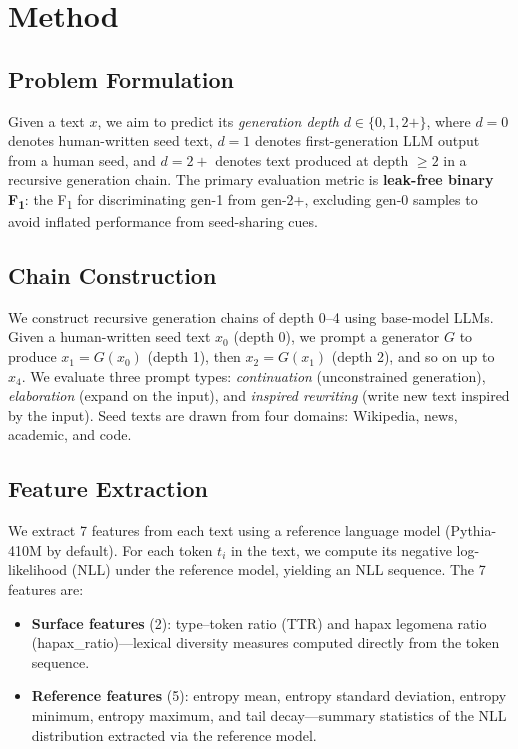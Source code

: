 \documentclass[11pt,a4paper]{article}
\newcommand{\fone}{F\textsubscript{1}}
\begin{document}
\section{Method}
\label{sec:method}

\subsection{Problem Formulation}
Given a text $x$, we aim to predict its \emph{generation depth} $d \in \{0, 1, 2+\}$,
where $d=0$ denotes human-written seed text, $d=1$ denotes first-generation LLM output from a human seed,
and $d=2+$ denotes text produced at depth $\geq 2$ in a recursive generation chain.
The primary evaluation metric is \textbf{leak-free binary \fone{}}: the \fone{} for discriminating gen-1 from gen-2+,
excluding gen-0 samples to avoid inflated performance from seed-sharing cues.

\subsection{Chain Construction}
\label{sec:chains}
We construct recursive generation chains of depth 0--4 using base-model LLMs.
Given a human-written seed text $x_0$ (depth 0), we prompt a generator $G$ to produce $x_1 = G(x_0)$ (depth 1),
then $x_2 = G(x_1)$ (depth 2), and so on up to $x_4$.
We evaluate three prompt types: \emph{continuation} (unconstrained generation),
\emph{elaboration} (expand on the input), and \emph{inspired rewriting} (write new text inspired by the input).
Seed texts are drawn from four domains: Wikipedia, news, academic, and code.

\subsection{Feature Extraction}
\label{sec:features}
We extract 7 features from each text using a reference language model (Pythia-410M by default).
For each token $t_i$ in the text, we compute its negative log-likelihood (NLL) under the reference model,
yielding an NLL sequence. The 7 features are:

\begin{itemize}[leftmargin=*,nosep]
\item \textbf{Surface features} (2): type--token ratio (TTR) and hapax legomena ratio (hapax\_ratio)---lexical diversity measures computed directly from the token sequence.
\item \textbf{Reference features} (5): entropy mean, entropy standard deviation, entropy minimum, entropy maximum, and tail decay---summary statistics of the NLL distribution extracted via the reference model.
\end{itemize}
\end{document}
